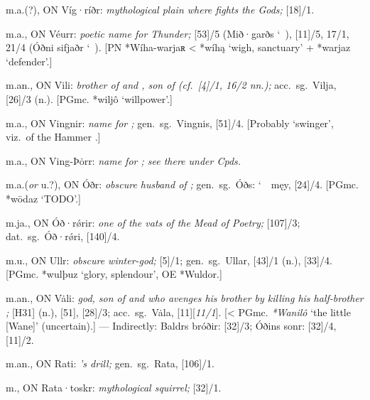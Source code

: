 \begin{itemize}
 m.a.(?), ON Víg·ríðr:
  \emph{mythological plain where  fights the Gods;} [18]/1.

 m.a., ON Véurr:
  \emph{poetic name for Thunder;} [53]/5 (Mið·garðs \char`~), [11]/5, 17/1, 21/4 (Óðni sifjaðr \char`~).
  [PN *Wíha-warjaʀ < *wíhą ‘wigh, sanctuary’ + *warjaz ‘defender’.]

 m.an., ON Vili:
  \emph{brother of  and , son of  (cf.~[4]/1, 16/2 nn.);} acc.~sg.~Vilja, [26]/3 (n.).
  [PGmc. *wiljô ‘willpower’.]

 m.a., ON Vingnir:
  \emph{name for ;} gen.~sg.~Vingnis, [51]/4.
  [Probably ‘swinger’, viz.~of the Hammer .]

 m.a., ON Ving-Þȯrr:
  \emph{name for ; see there under Cpds.}

 m.a.(\emph{or} u.?), ON Óðr:
  \emph{obscure husband of ;} gen.~sg.~Óðs: \char`~\ męy, [24]/4.
  [PGmc. *wōdaz ‘TODO’.]

 m.ja., ON Óð·rǿrir:
  \emph{one of the vats of the Mead of Poetry;} [107]/3; dat.~sg.~Óð·rǿri, [140]/4.

 m.u., ON Ullr:
  \emph{obscure winter-god;} [5]/1; gen.~sg.~Ullar, [43]/1 (n.), [33]/4.
  [PGmc. *wulþuz ‘glory, splendour’, OE *Wuldor.]

 m.an., ON Vȧli:
  \emph{god, son of  and  who avenges his brother  by killing his half-brother ;} [H31] (n.), [51], [28]/3; acc.~sg.~Vȧla, [11][\emph{11/1}].
  [< PGmc. \emph{*Wanilô} ‘the little [Wane]’ (uncertain).]
  --- Indirectly: Baldrs bróðir: [32]/3; Óðins sonr: [32]/4, [11]/2.

 m.an., ON Rati:
  \emph{’s drill;} gen.~sg.~Rata, [106]/1.

 m., ON Rata·toskr:
  \emph{mythological squirrel;} [32]/1.


\end{itemize}
